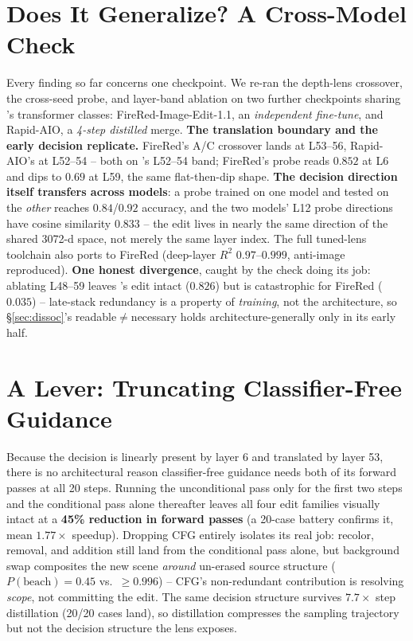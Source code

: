 \section{Does It Generalize? A Cross-Model Check}\label{sec:generalize}

Every finding so far concerns one checkpoint. We re-ran the depth-lens
crossover, the cross-seed probe, and layer-band ablation on two further
checkpoints sharing \model{}'s transformer classes: FireRed-Image-Edit-1.1,
an \emph{independent fine-tune}, and Rapid-AIO, a \emph{4-step distilled}
merge. \textbf{The translation boundary and the early decision replicate.}
FireRed's A/C crossover lands at L53--56, Rapid-AIO's at L52--54 -- both on
\model{}'s L52--54 band; FireRed's probe reads $0.852$ at L6 and dips to
$0.69$ at L59, the same flat-then-dip shape. \textbf{The decision direction
itself transfers across models}: a probe trained on one model and tested on
the \emph{other} reaches $0.84$/$0.92$ accuracy, and the two models'
L12 probe directions have cosine similarity $0.833$ -- the edit lives in
nearly the same direction of the shared 3072-d space, not merely the same
layer index. The full tuned-lens toolchain also ports to FireRed (deep-layer
$R^2$ $0.97$--$0.999$, anti-image reproduced). \textbf{One honest
divergence}, caught by the check doing its job: ablating L48--59 leaves
\model{}'s edit intact ($0.826$) but is catastrophic for FireRed ($0.035$)
-- late-stack redundancy is a property of \emph{training}, not the
architecture, so \S\ref{sec:dissoc}'s readable$\neq$necessary holds
architecture-generally only in its early half.

\section{A Lever: Truncating Classifier-Free Guidance}\label{sec:lever}

Because the decision is linearly present by layer 6 and translated by
layer 53, there is no architectural reason classifier-free guidance needs
both of its forward passes at all 20 steps. Running the unconditional pass
only for the first two steps and the conditional pass alone thereafter
leaves all four edit families visually intact at a \textbf{45\% reduction
in forward passes} (a 20-case battery confirms it, mean $1.77\times$
speedup). Dropping CFG entirely isolates its real job: recolor, removal,
and addition still land from the conditional pass alone, but background
swap composites the new scene \emph{around} un-erased source structure
($P(\text{beach}){=}0.45$ vs.\ ${\ge}0.996$) -- CFG's non-redundant
contribution is resolving \emph{scope}, not committing the edit. The same
decision structure survives $7.7\times$ step distillation (20/20 cases
land), so distillation compresses the sampling trajectory but not the
decision structure the lens exposes.
